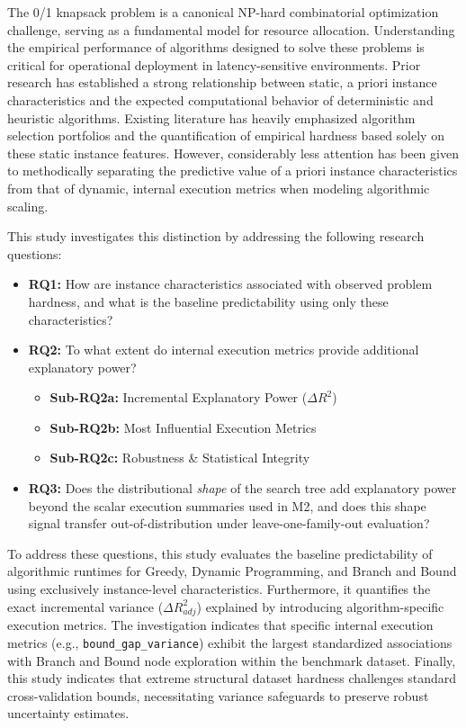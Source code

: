 \documentclass[11pt,a4paper]{article}
\begin{document}
The 0/1 knapsack problem is a canonical NP-hard combinatorial optimization challenge, serving as a fundamental model for resource allocation. Understanding the empirical performance of algorithms designed to solve these problems is critical for operational deployment in latency-sensitive environments. Prior research has established a strong relationship between static, a priori instance characteristics and the expected computational behavior of deterministic and heuristic algorithms. Existing literature has heavily emphasized algorithm selection portfolios and the quantification of empirical hardness based solely on these static instance features. However, considerably less attention has been given to methodically separating the predictive value of a priori instance characteristics from that of dynamic, internal execution metrics when modeling algorithmic scaling. 

This study investigates this distinction by addressing the following research questions:
\begin{itemize}
  \item \textbf{RQ1:} How are instance characteristics associated with observed problem hardness, and what is the baseline predictability using only these characteristics?
  \item \textbf{RQ2:} To what extent do internal execution metrics provide additional explanatory power?
\begin{itemize}
  \item \textbf{Sub-RQ2a:} Incremental Explanatory Power ($\Delta R^2$)
  \item \textbf{Sub-RQ2b:} Most Influential Execution Metrics
  \item \textbf{Sub-RQ2c:} Robustness \& Statistical Integrity
\end{itemize}
  \item \textbf{RQ3:} Does the distributional \emph{shape} of the search tree add explanatory power beyond the scalar execution summaries used in M2, and does this shape signal transfer out-of-distribution under leave-one-family-out evaluation?
\end{itemize}

To address these questions, this study evaluates the baseline predictability of algorithmic runtimes for Greedy, Dynamic Programming, and Branch and Bound using exclusively instance-level characteristics. Furthermore, it quantifies the exact incremental variance ($\Delta R^2_{adj}$) explained by introducing algorithm-specific execution metrics. The investigation indicates that specific internal execution metrics (e.g., \texttt{bound\_gap\_variance}) exhibit the largest standardized associations with Branch and Bound node exploration within the benchmark dataset. Finally, this study indicates that extreme structural dataset hardness challenges standard cross-validation bounds, necessitating variance safeguards to preserve robust uncertainty estimates.
\end{document}
